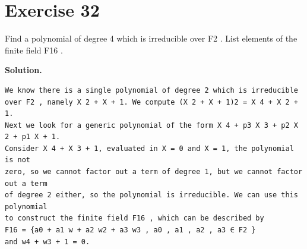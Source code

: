 \documentclass[11pt]{article}
\begin{document}
\section*{Exercise 32}
\begin{exercisebox}
Find a polynomial of degree 4 which is irreducible over F2 . List elements of the finite field F16 .

\end{exercisebox}
\begin{solutionbox}
\textbf{Solution.}

\begin{Verbatim}[fontsize=\small]
We know there is a single polynomial of degree 2 which is irreducible over F2 , namely X 2 + X + 1. We compute (X 2 + X + 1)2 = X 4 + X 2 + 1.
Next we look for a generic polynomial of the form X 4 + p3 X 3 + p2 X 2 + p1 X + 1.
Consider X 4 + X 3 + 1, evaluated in X = 0 and X = 1, the polynomial is not
zero, so we cannot factor out a term of degree 1, but we cannot factor out a term
of degree 2 either, so the polynomial is irreducible. We can use this polynomial
to construct the finite field F16 , which can be described by
F16 = {a0 + a1 w + a2 w2 + a3 w3 , a0 , a1 , a2 , a3 ∈ F2 }
and w4 + w3 + 1 = 0.
\end{Verbatim}
\end{solutionbox}
\end{document}
